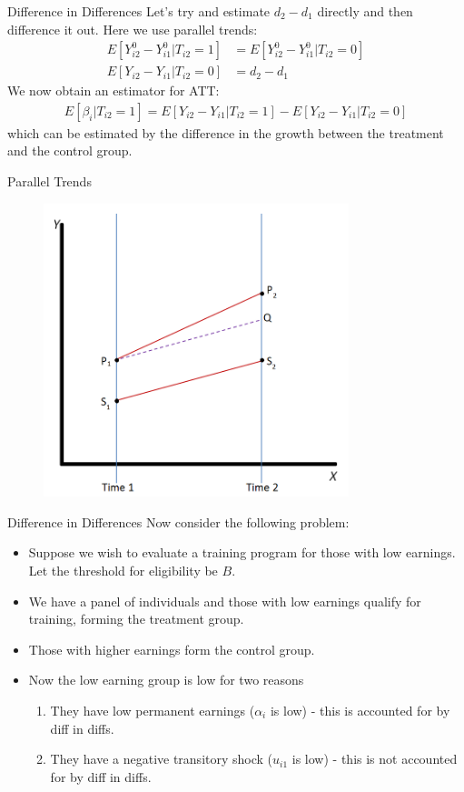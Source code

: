 \documentclass[xcolor=pdftex,dvipsnames,table,mathserif]{beamer}
\begin{document}
\begin{frame}{Difference in Differences} 
Let's try and estimate $d_2- d_1$ directly and then difference it out. Here we use \alert{parallel trends}:
\begin{align*}
E[Y_{i2}^0 - Y_{i1}^0 | T_{i2}=1]  &= E[Y_{i2}^0 - Y_{i1}^0 | T_{i2}=0] \\
E[Y_{i2} - Y_{i1} | T_{i2}=0] & = d_2-d_1
\end{align*}
We now obtain an estimator for ATT:
\begin{align*}
E[\beta_{i}| T_{i2}=1]  = E[Y_{i2} - Y_{i1} | T_{i2}=1] - E[Y_{i2} - Y_{i1} | T_{i2}=0]  
\end{align*}
which can be estimated by the difference in the growth between the treatment and the control group.
\end{frame}

\begin{frame}{Parallel Trends}
\begin{figure}
\centering
\includegraphics[width=3.5in]{./resources/parallel-trends}
\end{figure}
\end{frame}

\begin{frame}{Difference in Differences}
Now consider the following problem:
\begin{itemize}
\item Suppose we wish to evaluate a training program for those with low
earnings. Let the threshold for eligibility be $B$.
\item We have a panel of individuals and those with low earnings qualify for
training, forming the treatment group.
\item Those with higher earnings form the control group. 
\item Now the low earning group is low for two reasons
\begin{enumerate}
\item They have low permanent earnings ($\alpha_i$ is low) - this is accounted for by diff in diffs.
\item They have a negative transitory shock ($u_{i1}$ is low) - this is not accounted for by diff in diffs.
\end{enumerate} 
\end{itemize}
\end{frame} 
\end{document}
